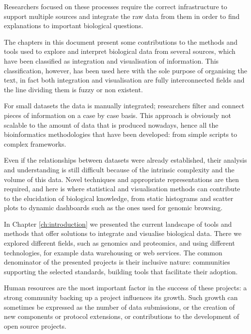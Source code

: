 Researchers focused on these processes require the correct infrastructure to support multiple sources and integrate the raw data from them in order to find explanations to important biological questions. 

The chapters in this document present some contributions to the methods and tools used to explore and interpret biological data from several sources, which have been classified as integration and visualisation of information. This classification, however, has been used here with the sole purpose of organising the text, in fact both integration and visualisation are fully interconnected fields and the line dividing them is fuzzy or non existent.

\vspace{5mm}

For small datasets the data is manually integrated; researchers  filter and connect pieces of information on a case by case basis. This approach is obviously not scalable to the amount of data that is produced nowadays, hence all the bioinformatics methodologies that have been developed: from simple scripts to complex frameworks.

Even if the relationships between datasets were already established, their analysis and understanding is still difficult because of the intrinsic complexity and the volume of this data. Novel techniques and appropriate representations are then required, and here is where statistical and visualisation methods can contribute to the elucidation of biological knowledge, from static histograms and scatter plots to dynamic dashboards such as the ones used for genomic browsing.

In Chapter \ref{ch:introduction} we presented the current landscape of tools and methods that offer solutions to integrate and visualise biological data. There we explored different fields, such as genomics and proteomics, and using different technologies, for example data warehousing or web services. The common denominator of the presented projects is their inclusive nature: communities supporting the selected standards, building tools that facilitate their adoption. 

Human resources are the most important factor in the success of these projects: a strong community backing up a project influences its growth. Such growth can sometimes be expressed as the number of data submissions, or the creation of new components or protocol extensions, or contributions to the development of open source projects.

